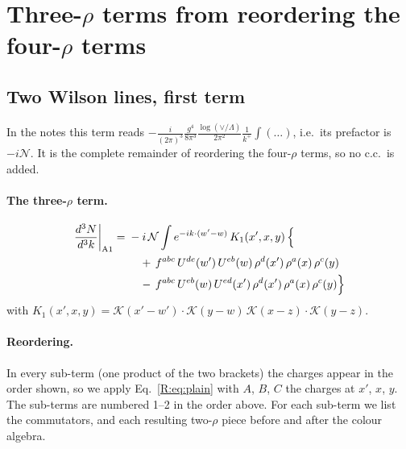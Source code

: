 \documentclass[10pt]{article}
\numberwithin{equation}{section}
\newcommand{\KK}{\mathcal K}
\newcommand{\NN}{\mathcal N}
\begin{document}
\section{Three-$\rho$ terms from reordering the four-$\rho$ terms}\label{R:sec:fourrho}
\subsection{Two Wilson lines, first term}\label{R:sec:A1}
In the notes this term reads $-\frac{i}{(2\pi)^3}\frac{g^4}{8\pi^3}\frac{\log(\vee/\Lambda)}{2\pi^2}\frac1{k^+}\int(\dots)$, i.e.\ its prefactor is $-i\NN$. It is the complete remainder of reordering the four-$\rho$ terms, so no c.c.\ is added.
\paragraph{The three-$\rho$ term.}
\begin{align}
\frac{d^3N}{d^3k}\bigg|_{\rm A1}={}&-i\,\NN\int e^{-ik\cdot(w'-w)}\,K_1(x',x,y)\,\Big\{\notag\\
&\quad +\,f^{abc}\,U^{de}(w')\,U^{eb}(w)\,\rho^{d}(x')\,\rho^{a}(x)\,\rho^{c}(y)\notag\\
&\quad -\,f^{abc}\,U^{eb}(w)\,U^{ed}(x')\,\rho^{d}(x')\,\rho^{a}(x)\,\rho^{c}(y)\Big\}\label{R:eq:in-A1}
\end{align}
with $K_1(x',x,y)=\KK(x'-w')\cdot\KK(y-w)\,\KK(x-z)\cdot\KK(y-z)$.
\paragraph{Reordering.} In every sub-term (one product of the two brackets) the charges appear in the order shown, so we apply Eq.~\eqref{R:eq:plain} with $A$, $B$, $C$ the charges at $x'$, $x$, $y$. The sub-terms are numbered 1--2 in the order above. For each sub-term we list the commutators, and each resulting two-$\rho$ piece before and after the colour algebra.
\end{document}

